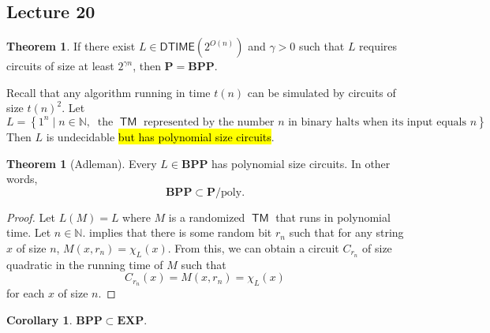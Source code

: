\documentclass[10pt,letterpaper,cm]{nupset}
\theoremstyle{definition}
\theoremstyle{theorem}
\newtheorem{theorem}[definition]{Theorem}
\newtheorem{corollary}[definition]{Corollary}
\theoremstyle{remark}
\newcommand{\N}{\mathbb N}
\newcommand{\1}{\mathbf{1}}
\newcommand{\0}{\vec 0}
\DeclareMathOperator{\TM}{\mathsf{TM}}
\begin{document}
\subsection{Lecture 20}

\begin{theorem}
If there exist $L \in \mathsf{DTIME}\left(2^{O(n)}\right)$ and $\gamma >0$ such that $L$ requires circuits of size at least $2^{\gamma{n}}$, then $\mathbf{P} = \mathbf{BPP}$.
\end{theorem}

\smallskip

Recall that any algorithm running in time $t(n)$ can be simulated by circuits of size $t(n)^2$. Let $$L = \left\{ 1^n \mid n \in \N, \ \text{ the }\TM\text{ represented by the number }n\text{ in binary halts when its input equals }n\right\}.$$ Then $L$ is undecidable \hl{but has polynomial size circuits}. 

\smallskip

\begin{theorem}[Adleman]
Every $L\in \mathbf{BPP}$ has polynomial size circuits. In other words, $$\mathbf{BPP} \subset \mathbf{P}/\mathrm{poly}.$$
\end{theorem}
\begin{proof}
Let $L(M)  = L$ where $M$ is a randomized $\TM$ that runs in polynomial time. Let $n\in \N$.  implies that there is some random bit $r_n$ such that for any string $x$ of size $n$, $M(x,r_n) = \chi_L(x)$. From this, we can obtain a circuit $C_{r_n}$ of size quadratic in the running time of $M$ such that $$C_{r_n}(x) = M(x,{r_n}) = \chi_L(x)$$ for each $x$ of size $n$.
\end{proof}

\begin{corollary}
$\mathbf{BPP} \subset \mathbf{EXP}$.
\end{corollary}
\end{document}
